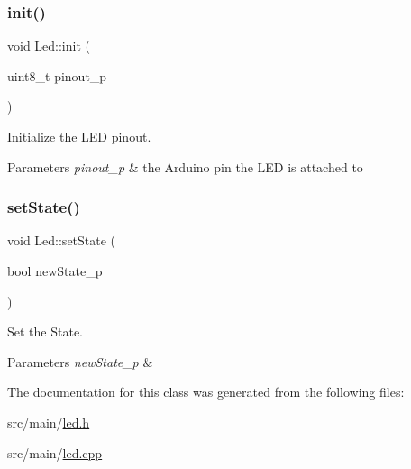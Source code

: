 \subsubsection{\texorpdfstring{init()}{init()}}
{\footnotesize\ttfamily void Led\+::init (\begin{DoxyParamCaption}\item[{uint8\+\_\+t}]{pinout\+\_\+p }\end{DoxyParamCaption})}



Initialize the L\+ED pinout. 


\begin{DoxyParams}{Parameters}
{\em pinout\+\_\+p} & the Arduino pin the L\+ED is attached to \\
\hline
\end{DoxyParams}
\mbox{\label{class_led_a9136de456f7df8e202e880312767a566}} 
\subsubsection{\texorpdfstring{set\+State()}{setState()}}
{\footnotesize\ttfamily void Led\+::set\+State (\begin{DoxyParamCaption}\item[{bool}]{new\+State\+\_\+p }\end{DoxyParamCaption})}



Set the State. 


\begin{DoxyParams}{Parameters}
{\em new\+State\+\_\+p} & \\
\hline
\end{DoxyParams}


The documentation for this class was generated from the following files\+:\begin{DoxyCompactItemize}
\item 
src/main/\hyperlink{led_8h}{led.\+h}\item 
src/main/\hyperlink{led_8cpp}{led.\+cpp}\end{DoxyCompactItemize}
